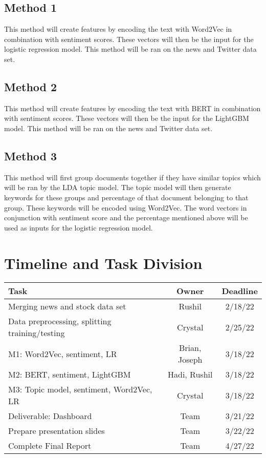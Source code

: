 \documentclass[conference]{IEEEtran}
\begin{document}
\subsection{Method 1}
This method will create features by encoding the text with Word2Vec in combination with sentiment scores. These vectors will then be the input for the logistic regression model. This method will be ran on the news and Twitter data set. 
\subsection{Method 2}
This method will create features by encoding the text with BERT in combination with sentiment scores. These vectors will then be the input for the LightGBM model. This method will be ran on the news and Twitter data set. 
\subsection{Method 3}
This method will first group documents together if they have similar topics which will be ran by the LDA topic model. The topic model will then generate keywords for these groups and percentage of that document belonging to that group. These keywords will be encoded using Word2Vec. The word vectors in conjunction with sentiment score and the percentage mentioned above will be used as inputs for the logistic regression model.

\section{Timeline and Task Division}
\begin{table}[htp]
    \begin{center}
        \begin{tabular}{|l||c|c|} \hline\hline
            Task                                               & Owner         & Deadline  \\ \hline
            Merging news and stock data set                    & Rushil        & 2/18/22   \\
            Data preprocessing, splitting training/testing & Crystal       & 2/25/22   \\
            M1: Word2Vec, sentiment, LR                  & Brian, Joseph & 3/18/22   \\
            M2: BERT, sentiment, LightGBM                & Hadi, Rushil  & 3/18/22   \\
            M3: Topic model, sentiment, Word2Vec, LR     & Crystal       & 3/18/22 \\
            Deliverable: Dashboard                             & Team          & 3/21/22 \\
            Prepare presentation slides                             & Team          & 3/22/22 \\
            Complete Final Report                             & Team          & 4/27/22 \\
            \hline\hline
        \end{tabular}
    \end{center}
\end{table}
\end{document}
